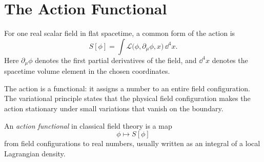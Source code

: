 \section{The Action Functional}

For one real scalar field in flat spacetime, a common form of the action is
\[
    S[\phi]
    =
    \int \mathcal{L}\bigl(\phi,\partial_\mu\phi,x\bigr)\,\dd^4x.
\]
Here \(\partial_\mu\phi\) denotes the first partial derivatives of the field,
and \(\dd^4x\) denotes the spacetime volume element in the chosen coordinates.

The action is a functional: it assigns a number to an entire field
configuration. The variational principle states that the physical field
configuration makes the action stationary under small variations that vanish on
the boundary.

\begin{definitionbox}
An \emph{action functional} in classical field theory is a map
\[
    \phi \mapsto S[\phi]
\]
from field configurations to real numbers, usually written as an integral of a
local Lagrangian density.
\end{definitionbox}
